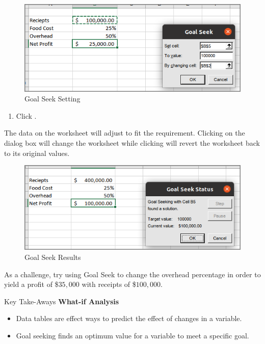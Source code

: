 \begin{figure}[H]
	\centering
	\includegraphics[width=\maxwidth{.95\linewidth}]{gfx/ch07_fig51}
	\caption{Goal Seek Setting}
	\label{07:fig51}
\end{figure}

\begin{enumerate}[resume]
	\item Click .
\end{enumerate}

The data on the worksheet will adjust to fit the requirement. Clicking  on the  dialog box will change the worksheet while clicking  will revert the worksheet back to its original values.

\begin{figure}[H]
	\centering
	\includegraphics[width=\maxwidth{.95\linewidth}]{gfx/ch07_fig52}
	\caption{Goal Seek Results}
	\label{07:fig52}
\end{figure}

As a challenge, try using Goal Seek to change the overhead percentage in order to yield a profit of \$$ 35,000 $ with receipts of \$$ 100,000 $. 

\begin{center}
	\begin{tkwbox}{Key Take-Aways}
		\textbf{What-if Analysis}
		\\
		\begin{itemize}
			\setlength{\itemsep}{0pt}
			\setlength{\parskip}{0pt}
			\setlength{\parsep}{0pt}
			
			\item Data tables are effect ways to predict the effect of changes in a variable.
			\item Goal seeking finds an optimum value for a variable to meet a specific goal.
			
		\end{itemize}
	\end{tkwbox}
\end{center}

